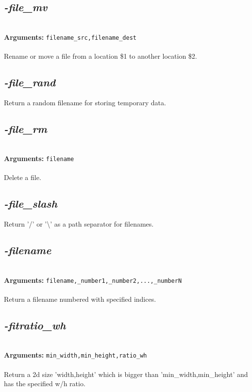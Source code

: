 \documentclass[a4paper,11pt,twoside]{book}
\begin{document}
\subsection{\emph{-file\_mv} }\vspace*{-0.5em}
~\\\textbf{Arguments: } 
{\small \texttt{filename\_src,filename\_dest}}\\~\\
Rename or move a file from a location \$1 to another location \$2.


\subsection{\emph{-file\_rand} }\vspace*{-0.5em}
Return a random filename for storing temporary data.


\subsection{\emph{-file\_rm} }\vspace*{-0.5em}
~\\\textbf{Arguments: } 
{\small \texttt{filename}}\\~\\
Delete a file.


\subsection{\emph{-file\_slash} }\vspace*{-0.5em}
Return '/' or '\textbackslash ' as a path separator for filenames.


\subsection{\emph{-filename} }\vspace*{-0.5em}
~\\\textbf{Arguments: } 
{\small \texttt{filename,\_number1,\_number2,...,\_numberN}}\\~\\
Return a filename numbered with specified indices.


\subsection{\emph{-fitratio\_wh} }\vspace*{-0.5em}
~\\\textbf{Arguments: } 
{\small \texttt{min\_width,min\_height,ratio\_wh}}\\~\\
Return a 2d size 'width,height' which is bigger than 'min\_width,min\_height' and has the specified w/h ratio.
\end{document}

